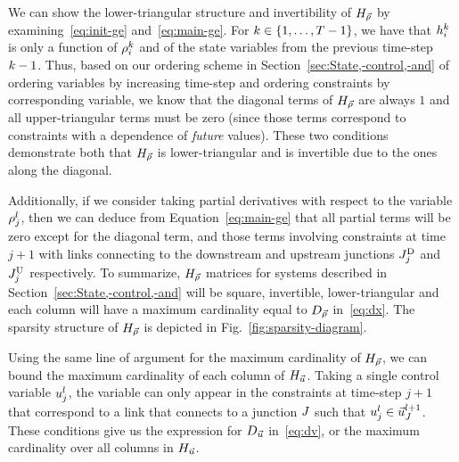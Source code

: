 We can show the lower-triangular structure and invertibility of $H_{\vec{\rho}}$
by examining~\eqref{eq:init-ge} and~\eqref{eq:main-ge}. For $\tind\in\intrange 1{\ntime-1}$,
we have that $h_{i}^{k}$ is only a function of $\rho_{i}^{k}$
and of the state variables from the previous time-step $k-1$.
Thus, based on our ordering scheme in Section~\ref{sec:State,-control,-and}
of ordering variables by increasing time-step and ordering constraints
by corresponding variable, we know that the diagonal terms of $H_{\vec{\rho}}$ are
always $1$ and all upper-triangular terms must be zero (since those
terms correspond to constraints with a dependence of \emph{future}
values). These two conditions demonstrate both that $H_{\vec{\rho}}$ is lower-triangular
and is invertible due to the ones along the diagonal.

Additionally, if we consider taking partial derivatives with respect
to the variable $\rho_{j}^{l}$, then we can deduce from Equation~\eqref{eq:main-ge}
that all partial terms will be zero except for the diagonal term,
and those terms involving constraints at time $j+1$ with links connecting
to the downstream and upstream junctions $J_{j}^{\text{D}}$ and $J_{j}^{\text{U}}$
respectively. To summarize, $H_{\vec{\rho}}$ matrices for systems described
in Section~\ref{sec:State,-control,-and} will be square, invertible,
lower-triangular and each column will have a maximum cardinality equal
to $D_{\vec{\rho}}$ in~\eqref{eq:dx}. The sparsity structure of
$H_{\vec{\rho}}$ is depicted in Fig.~\ref{fig:sparsity-diagram}.

Using the same line of argument for the maximum cardinality of $H_{\vec{\rho}}$,
we can bound the maximum cardinality of each column of $H_{\vec{u}}$. Taking
a single control variable $u_{j}^{l}$, the variable can only
appear in the constraints at time-step $j+1$ that correspond to a link
that connects to a junction $J$ such that $u_{j}^{l}\in\vec{u}_{J}^{l+1}$.
These conditions give us the expression for $D_{\vec{u}}$ in~\eqref{eq:dv},
or the maximum cardinality over all columns in $H_{\vec{u}}$.

